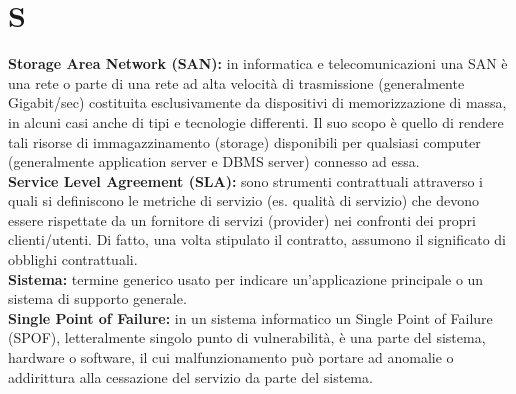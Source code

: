 \documentclass[12pt, a4paper, titlepage]{report}
\begin{document}
	\section*{S}
	\textbf{Storage Area Network (SAN):} in informatica e telecomunicazioni una SAN è una rete o parte di una rete ad alta velocità di trasmissione (generalmente Gigabit/sec) costituita esclusivamente da dispositivi di memorizzazione di massa, in alcuni casi anche di tipi e tecnologie differenti. Il suo scopo è quello di rendere tali risorse di immagazzinamento (storage) disponibili per qualsiasi computer (generalmente application server e DBMS server) connesso ad essa.\\
	\textbf{Service Level Agreement (SLA):} sono strumenti contrattuali attraverso i quali si definiscono le metriche di servizio (es. qualità di servizio) che devono essere rispettate da un fornitore di servizi (provider) nei confronti dei propri clienti/utenti. Di fatto, una volta stipulato il contratto, assumono il significato di obblighi contrattuali.\\
	\textbf{Sistema:} termine generico usato per indicare un'applicazione principale o un sistema di supporto generale.\\
	\textbf{Single Point of Failure:} in un sistema informatico un Single Point of Failure (SPOF), letteralmente singolo punto di vulnerabilità, è una parte del sistema, hardware o software, il cui malfunzionamento può portare ad anomalie o addirittura alla cessazione del servizio da parte del sistema.
	
	
\end{document}
